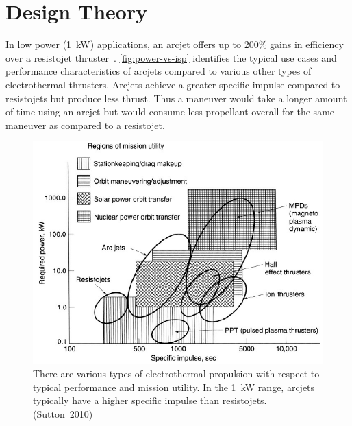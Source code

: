 \documentclass[journal]{IEEEtran}
\begin{document}
\section{Design Theory}
\label{sec:method}
In low power (\SI{1}{\kilo\watt}) applications, an arcjet offers up to 200\% gains in efficiency over a resistojet thruster~\cite{sutton2010rocket}.
\autoref{fig:power-vs-isp} identifies the typical use cases and performance characteristics of arcjets compared to various other types of electrothermal thrusters.
Arcjets achieve a greater specific impulse compared to resistojets but produce less thrust.
Thus a maneuver would take a longer amount of time using an arcjet but would consume less propellant overall for the same maneuver as compared to a resistojet.
\begin{figure}[htp]
  \centering
  \includegraphics[width=\linewidth]{figs/power-vs-isp_sutton}
  \caption[Types of electrothermal propulsion]{There are various types of electrothermal propulsion with respect to typical performance and mission utility.
  In the \SI{1}{\kilo\watt} range, arcjets typically have a higher specific impulse than resistojets. (Sutton~2010)
\label{fig:power-vs-isp}}
\end{figure}
\end{document}
